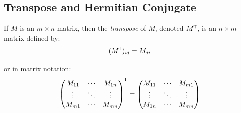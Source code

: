 \documentclass[../main.tex]{subfiles}
\begin{document}
\subsection{Transpose and Hermitian Conjugate}
\label{transposeAndConjugate}
\begin{definition}[]
  If $M$ is an $m \times n$ matrix, then the \textit{transpose} of $M$, denoted $M^{{\mkern-1.5mu\mathsf{T}}}$, is an $n \times m$ matrix defined by:
  \[
    (M^{{\mkern-1.5mu\mathsf{T}}})_{i j} = M_{j i}
  \]
\end{definition}
or in matrix notation:
\[
  \begin{pmatrix}
  M_{1 1} & \cdots & M_{1 n} \\
  \vdots & \ddots & \vdots \\
  M_{m 1} & \cdots & M_{m n} \\
  \end{pmatrix}^{{\mkern-1.5mu\mathsf{T}}} =
  \begin{pmatrix}
  M_{1 1} & \cdots & M_{m 1} \\
  \vdots & \ddots & \vdots \\
  M_{1 n} & \cdots & M_{m n} \\
  \end{pmatrix}
\]
\end{document}
